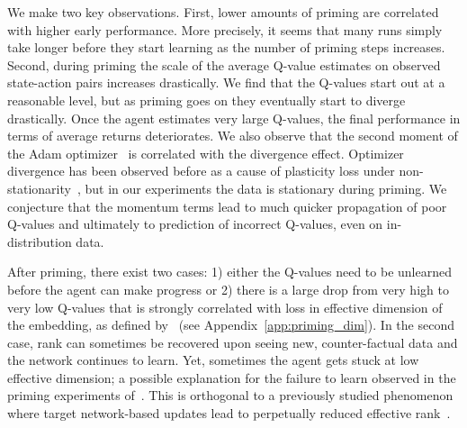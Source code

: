We make two key observations. First, lower amounts of priming are correlated with higher early performance. More precisely, it seems that many runs simply take longer before they start learning as the number of priming steps increases. Second, during priming the scale of the average Q-value estimates on observed state-action pairs increases drastically. We find that the Q-values start out at a reasonable level, but as priming goes on they eventually start to diverge drastically. Once the agent estimates very large Q-values, the final performance in terms of average returns deteriorates. We also observe that the second moment of the Adam optimizer~\parencite{kingma2015adam} is correlated with the divergence effect. Optimizer divergence has been observed before as a cause of plasticity loss under non-stationarity~\parencite{lyle2023understanding}, but in our experiments the data is stationary during priming. We conjecture that the momentum terms lead to much quicker propagation of poor Q-values and ultimately to prediction of incorrect Q-values, even on in-distribution data.


After priming, there exist two cases: 1) either the Q-values need to be unlearned before the agent can make progress or 2) there is a large drop from very high to very low Q-values that is strongly correlated with loss in effective dimension of the embedding, as defined by~\cite{yang2020harnessing} (see Appendix~\ref{app:priming_dim}). In the second case, rank can sometimes be recovered upon seeing new, counter-factual data and the network continues to learn. Yet, sometimes the agent gets stuck at low effective dimension; a possible explanation for the failure to learn observed in the priming experiments of~\textcite{nikishin2022primacy}. This is orthogonal to a previously studied phenomenon where target network-based updates lead to perpetually reduced effective rank~\parencite{kumar2021implicit}.


